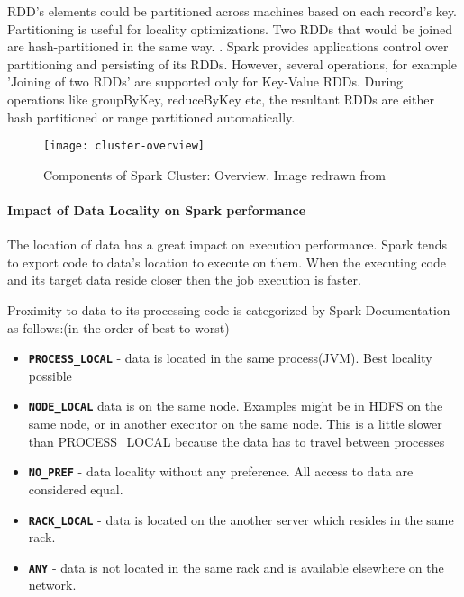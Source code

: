 \documentclass[article,type=msc,colorback,12pt,accentcolor=tud1d]{tudthesis}
\begin{document}
		   RDD's elements could be partitioned across machines based on each record's key. Partitioning is useful for locality optimizations. Two RDDs that would be joined are hash-partitioned in the same way. \cite{RDDmainpaper}. Spark provides applications control over partitioning and persisting of its RDDs. However, several operations, for example 'Joining of two RDDs' are supported only for Key-Value RDDs.  During operations like groupByKey, reduceByKey etc, the resultant RDDs are either hash partitioned or range partitioned automatically.
		   		   
		     \begin{figure}[p]
		     	\centering
		     	\texttt{[image: cluster-overview]}
		     	\caption{Components of Spark Cluster: Overview. Image redrawn from  \cite{sparkcluster}  }
		     	\label{fig:sparkcluster}
		     \end{figure}
		   
		    \clearpage
		    \paragraph{Impact of Data Locality on Spark performance} \label{datalocality}
		    
		    The location of data has a great impact on execution performance. Spark tends to export code to data's location to execute on them. When the executing code and its target data reside closer then the job execution is faster. 
		    
		    Proximity to data to its processing code is categorized by Spark Documentation \cite{sparkLocality} as follows:(in the order of best to worst)
		    \begin{itemize}
		    	\item \textbf{\texttt{PROCESS\_LOCAL}} - data is located in the same process(JVM). Best locality possible
		    	
		    	\item \textbf{\texttt{NODE\_LOCAL}} data is on the same node. Examples might be in HDFS on the same node, or in another executor on the same node. This is a little slower than PROCESS\_LOCAL because the data has to travel between processes
		    	
		    	\item \textbf{\texttt{NO\_PREF}} - data locality without any preference. All access to data are considered equal.
		    	
		    	\item \textbf{\texttt{RACK\_LOCAL}} - data is located on the another server which resides in the same rack. 
		    	
		    	\item \textbf{\texttt{ANY}} -  data is not located in the same rack and is available elsewhere on the network.
		    \end{itemize}
		    
\end{document}
